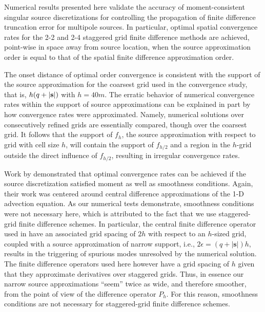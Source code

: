 Numerical results presented here validate the accuracy of moment-consistent singular source discretizations for controlling the propagation of finite difference truncation error for multipole sources.  
In particular, optimal spatial convergence rates for the 2-2 and 2-4 staggered grid finite difference methods are achieved, point-wise in space away from source location, when the source approximation order is equal to that of the spatial finite difference approximation order.

The onset distance of optimal order convergence is consistent with the support of the source approximation for the coarsest grid used in the convergence study, that is, $h(q+|{\bf s}|)$ with $h=40m$.
The erratic behavior of numerical convergence rates within the support of source approximations can be explained in part by how convergence rates were approximated.
Namely, numerical solutions over consecutively refined grids are essentially compared, though over the coarsest grid.
It follows that the support of $f_{h}$, the source approximation with respect to grid with cell size $h$, will contain the support of $f_{h/2}$ and a region in the $h$-grid outside the direct influence of $f_{h/2}$, resulting in irregular convergence rates.

Work by \cite{Petersson:2016} demonstrated that optimal convergence rates can be achieved if the source discretization satisfied moment as well as smoothness conditions.
Again, their work was centered around central difference approximations of the 1-D advection equation.
As our numerical tests demonstrate, smoothness conditions were not necessary here, which is attributed to the fact that we use staggered-grid finite difference schemes. 
In particular, the central finite difference operator used in \cite{Petersson:2016} have an associated grid spacing of $2h$ with respect to an $h$-sized grid, coupled with a source approximation of narrow support, i.e., $2\epsilon=(q+|\mathbf s|)h$, results in the triggering of spurious modes unresolved by the numerical solution.
The finite difference operators used here however have a grid spacing of $h$ given that they approximate derivatives over staggered grids.
Thus, in essence our narrow source approximations ``seem'' twice as wide, and therefore smoother, from the point of view of the difference operator $P_h$.
For this reason, smoothness conditions are not necessary for staggered-grid finite difference schemes.






